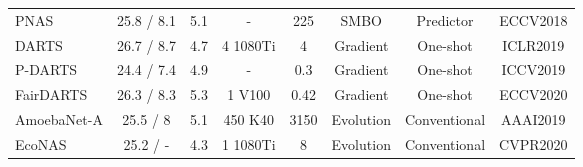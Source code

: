 \documentclass[sigconf]{acmart}
\begin{document}
\begin{table*}[!th]
\begin{tabular}{l|c|c|c|c|c|c|c}
PNAS \cite{Ref:40}                                       & 25.8 / 8.1                                                                                  & 5.1                                                           & -                                & 225                                                                       & SMBO                                       & Predictor   &ECCV2018                                    \\
DARTS \cite{Ref:10}                         & 26.7 / 8.7                                                                                & 4.7                                                           & 4 1080Ti                         & 4                                                                       & Gradient                                   & One-shot  &ICLR2019                                     \\
P-DARTS \cite{Ref:52}                     & 24.4 / 7.4                                                                                         & 4.9                                                           & -                                & 0.3                                                                       & Gradient                                  & One-shot &ICCV2019                                        \\
FairDARTS \cite{Ref:35}                  & 26.3 / 8.3                                                                                        & 5.3                                                           & 1 V100                                & 0.42                                                                       & Gradient                                  & One-shot           &ECCV2020                            \\
AmoebaNet-A \cite{Ref:08}                        & 25.5 / 8                                                                                  & 5.1                                                           & 450 K40                          & 3150                                                                      & Evolution                                  & Conventional  &AAAI2019                                  \\
EcoNAS \cite{Ref:58}                  & 25.2 / -                                                                                      & 4.3                                                           & 1 1080Ti                                & 8                                                                       & Evolution                                  & Conventional  &CVPR2020                                        \\


\end{tabular}
\end{table*}
\end{document}
